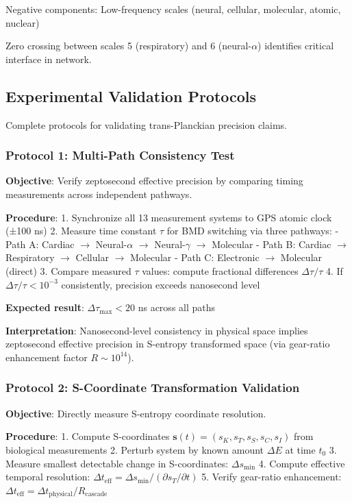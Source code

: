 \documentclass[11pt,onecolumn]{article}
\begin{document}
Negative components: Low-frequency scales (neural, cellular, molecular, atomic, nuclear)

Zero crossing between scales 5 (respiratory) and 6 (neural-$\alpha$) identifies critical interface in network.

\subsection{Experimental Validation Protocols}

Complete protocols for validating trans-Planckian precision claims.

\subsubsection{Protocol 1: Multi-Path Consistency Test}

\textbf{Objective}: Verify zeptosecond effective precision by comparing timing measurements across independent pathways.

\textbf{Procedure}:
1. Synchronize all 13 measurement systems to GPS atomic clock (±100 ns)
2. Measure time constant $\tau$ for BMD switching via three pathways:
   - Path A: Cardiac $\to$ Neural-$\alpha$ $\to$ Neural-$\gamma$ $\to$ Molecular
   - Path B: Cardiac $\to$ Respiratory $\to$ Cellular $\to$ Molecular
   - Path C: Electronic $\to$ Molecular (direct)
3. Compare measured $\tau$ values: compute fractional differences $\Delta\tau/\tau$
4. If $\Delta\tau/\tau < 10^{-3}$ consistently, precision exceeds nanosecond level

\textbf{Expected result}: $\Delta\tau_{\max} < 20$ ns across all paths

\textbf{Interpretation}: Nanosecond-level consistency in physical space implies zeptosecond effective precision in S-entropy transformed space (via gear-ratio enhancement factor $R \sim 10^{14}$).

\subsubsection{Protocol 2: S-Coordinate Transformation Validation}

\textbf{Objective}: Directly measure S-entropy coordinate resolution.

\textbf{Procedure}:
1. Compute S-coordinates $\mathbf{s}(t) = (s_K, s_T, s_S, s_C, s_I)$ from biological measurements
2. Perturb system by known amount $\Delta E$ at time $t_0$
3. Measure smallest detectable change in S-coordinates: $\Delta s_{\min}$
4. Compute effective temporal resolution: $\Delta t_{\text{eff}} = \Delta s_{\min} / (\partial s_T/\partial t)$
5. Verify gear-ratio enhancement: $\Delta t_{\text{eff}} = \Delta t_{\text{physical}} / R_{\text{cascade}}$
\end{document}
